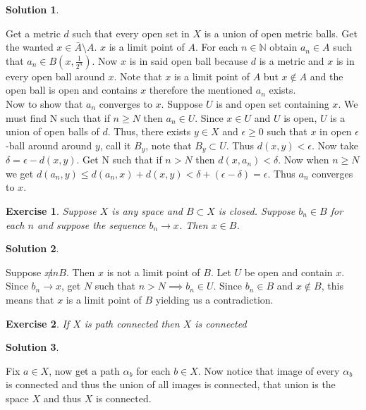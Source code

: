 \documentclass[11pt,a4paper]{article}
\newtheorem{Ex}{Exercise}
\newtheorem{Sol}{Solution}
\begin{document}
\begin{Sol}\end{Sol}
\noindent Get a metric $d$ such that every open set in $X$ is a union of open metric balls. Get the wanted $x \in \bar{A} \setminus A$. $x$ is a limit point of $A$. For each $n\in\mathbb{N}$ obtain $a_n \in A$ such that $a_n \in B(x, \frac{1}{2^n})$. Now $x$ is in said open ball  because $d$ is a metric and $x$ is in every open ball around $x$. Note that $x$ is a limit point of $A$ but $x\not \in A$ and the open ball is open and contains $x$ therefore the mentioned $a_n$ exists.\\
Now to show that $a_n$ converges to $x$. Suppose $U$ is and open set containing $x$. We must find N such that if $n\ge N$ then $a_n \in U$. Since $x\in U$ and $U$ is open, $U$ is a union of open balls of $d$. Thus, there exists $y\in X$ and $\epsilon \ge 0$ such that $x$ in open $\epsilon$-ball around around $y$, call it $B_y$, note that $B_y \subset U$. Thus $d(x,y) < \epsilon$. Now take $\delta = \epsilon - d(x,y)$. Get N such that if $n>N$ then $d(x,a_n) < \delta$. Now when $n\ge N$ we get $d(a_n,y) \le d(a_n,x)+d(x,y)< \delta + (\epsilon-\delta)=\epsilon$. Thus $a_n$ converges to $x$.

\begin{Ex}
	Suppose $X$ is any space and $B \subset X$ is closed. Suppose $b_n \in B$ for each $n$ and suppose the sequence $b_n \rightarrow x$. Then $x \in B$.
\end{Ex}

\begin{Sol}\end{Sol}
Suppose $x\not in B$. Then $x$ is not a limit point of $B$. Let $U$ be open and contain $x$. Since $b_n \rightarrow x$, get $N$ such that $n>N \implies b_n \in U$. Since $b_n \in B$ and $x \not \in B$, this means that $x$ is a limit point of $B$ yielding us a contradiction.

\begin{Ex}
	If $X$ is path connected then $X$ is connected
\end{Ex}
\begin{Sol}\end{Sol}
\noindent Fix $a \in X$, now get a path $\alpha_b$ for each $b\in X$. Now notice that image of every $\alpha_b$ is connected and thus the union of all images is connected, that union is the space $X$ and thus $X$ is connected.
\end{document}

